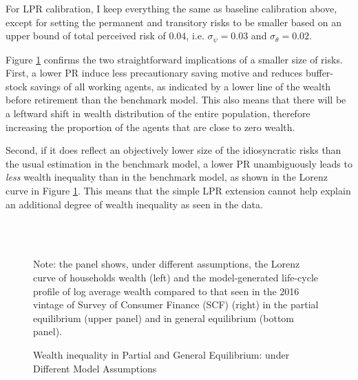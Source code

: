 For LPR calibration, I keep everything the same as baseline calibration above, except for setting the permanent and transitory risks to be smaller based on an upper bound of total perceived risk of $0.04$, i.e. $\sigma_\psi=0.03$ and $\sigma_\theta=0.02$. 

Figure \ref{fig:StE_dist_compare} confirms the two straightforward implications of a smaller size of risks. First, a lower PR induce less precautionary saving motive and reduces buffer-stock savings of all working agents, as indicated by a lower line of the wealth before retirement than the benchmark model. This also means that there will be a leftward shift in wealth distribution of the entire population, therefore increasing the proportion of the agents that are close to zero wealth. 

Second, if it does reflect an objectively lower size of the idiosyncratic risks than the usual estimation in the benchmark model, a lower PR unambiguously leads to \emph{less} wealth inequality than in the benchmark model, as shown in the Lorenz curve in Figure \ref{fig:StE_dist_compare}. This means that the simple LPR extension cannot help explain an additional degree of wealth inequality as seen in the data.


\begin{figure}[!ht]
	\caption{Wealth inequality in Partial and General Equilibrium: under Different Model Assumptions}
	\label{fig:StE_dist_compare}
	\begin{center}
	 \\
	 \\
	
\end{center}
\begin{flushleft}Note: the panel shows, under different assumptions, the Lorenz curve of households wealth (left) and the model-generated life-cycle profile of log average wealth compared to that seen in the 2016 vintage of Survey of Consumer Finance (SCF) (right) in the partial equilibrium (upper panel) and in general equilibrium (bottom panel). \end{flushleft}
\end{figure}

